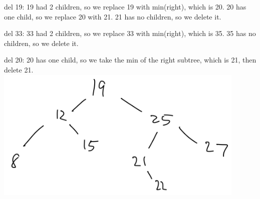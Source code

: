 \documentclass[11pt,largemargins]{homework}
\begin{document}
\begin{alphaparts}
  del 19: 19 had 2 children, so we replace 19 with min(right), which is 20.
  20 has one child, so we replace 20 with 21. 21 has no children, so we delete it.

  del 33: 33 had 2 children, so we replace 33 with min(right), which is 35.
  35 has no children, so we delete it.

  del 20: 20 has one child, so we take the min of the right subtree, which is 21, then delete 21.
  \questionpart
  \includegraphics[width=0.9\textwidth]{pictures/hw3/q4d.jpeg}


\end{alphaparts}
\end{document}

